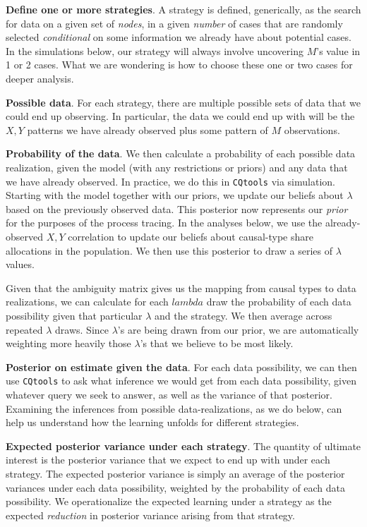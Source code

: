 \documentclass[
  12pt,
]{book}
\begin{document}
\textbf{Define one or more strategies}. A strategy is defined, generically, as the search for data on a given set of \emph{nodes}, in a given \emph{number} of cases that are randomly selected \emph{conditional} on some information we already have about potential cases. In the simulations below, our strategy will always involve uncovering \(M\)'s value in 1 or 2 cases. What we are wondering is how to choose these one or two cases for deeper analysis.

\textbf{Possible data}. For each strategy, there are multiple possible sets of data that we could end up observing. In particular, the data we could end up with will be the \(X,Y\) patterns we have already observed plus some pattern of \(M\) observations.

\textbf{Probability of the data}. We then calculate a probability of each possible data realization, given the model (with any restrictions or priors) and any data that we have already observed. In practice, we do this in \texttt{CQtools} via simulation. Starting with the model together with our priors, we update our beliefs about \(\lambda\) based on the previously observed data. This posterior now represents our \emph{prior} for the purposes of the process tracing. In the analyses below, we use the already-observed \(X,Y\) correlation to update our beliefs about causal-type share allocations in the population. We then use this posterior to draw a series of \(\lambda\) values.

Given that the ambiguity matrix gives us the mapping from causal types to data realizations, we can calculate for each \(lambda\) draw the probability of each data possibility given that particular \(\lambda\) and the strategy. We then average across repeated \(\lambda\) draws. Since \(\lambda\)'s are being drawn from our prior, we are automatically weighting more heavily those \(\lambda\)'s that we believe to be most likely.

\textbf{Posterior on estimate given the data}. For each data possibility, we can then use \texttt{CQtools} to ask what inference we would get from each data possibility, given whatever query we seek to answer, as well as the variance of that posterior. Examining the inferences from possible data-realizations, as we do below, can help us understand how the learning unfolds for different strategies.

\textbf{Expected posterior variance under each strategy}. The quantity of ultimate interest is the posterior variance that we expect to end up with under each strategy. The expected posterior variance is simply an average of the posterior variances under each data possibility, weighted by the probability of each data possibility. We operationalize the expected learning under a strategy as the expected \emph{reduction} in posterior variance arising from that strategy.
\end{document}
